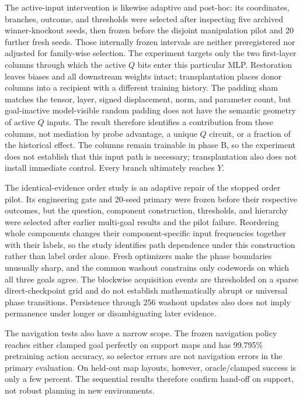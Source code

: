 \documentclass[11pt,a4paper]{article}
\begin{document}
The active-input intervention is likewise adaptive and post-hoc: its coordinates, branches, outcome, and thresholds were selected after inspecting five archived winner-knockout seeds, then frozen before the disjoint manipulation pilot and 20 further fresh seeds. Those internally frozen intervals are neither preregistered nor adjusted for family-wise selection. The experiment targets only the two first-layer columns through which the active $Q$ bits enter this particular MLP. Restoration leaves biases and all downstream weights intact; transplantation places donor columns into a recipient with a different training history. The padding sham matches the tensor, layer, signed displacement, norm, and parameter count, but goal-inactive model-visible random padding does not have the semantic geometry of active $Q$ inputs. The result therefore identifies a contribution from these columns, not mediation by probe advantage, a unique $Q$ circuit, or a fraction of the historical effect. The columns remain trainable in phase B, so the experiment does not establish that this input path is necessary; transplantation also does not install immediate control. Every branch ultimately reaches $Y$.

The identical-evidence order study is an adaptive repair of the stopped order pilot. Its engineering gate and 20-seed primary were frozen before their respective outcomes, but the question, component construction, thresholds, and hierarchy were selected after earlier multi-goal results and the pilot failure. Reordering whole components changes their component-specific input frequencies together with their labels, so the study identifies path dependence under this construction rather than label order alone. Fresh optimizers make the phase boundaries unusually sharp, and the common washout constrains only codewords on which all three goals agree. The blockwise acquisition events are thresholded on a sparse direct-checkpoint grid and do not establish mathematically abrupt or universal phase transitions. Persistence through 256 washout updates also does not imply permanence under longer or disambiguating later evidence.

The navigation tests also have a narrow scope. The frozen navigation policy reaches either clamped goal perfectly on support maps and has 99.795\% pretraining action accuracy, so selector errors are not navigation errors in the primary evaluation. On held-out map layouts, however, oracle/clamped success is only a few percent. The sequential results therefore confirm hand-off on support, not robust planning in new environments.
\end{document}
